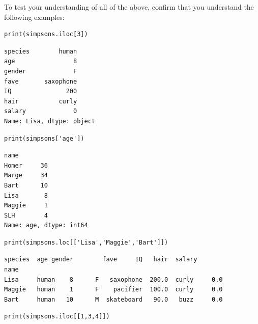 To test your understanding of all of the above, confirm that you understand the
following examples:

\begin{Verbatim}[fontsize=\CBCodeSmall,samepage=true,frame=single,framesep=3mm]
print(simpsons.iloc[3])
\end{Verbatim}
\vspace{-.2in}

\begin{Verbatim}[fontsize=\CBCodeSmall,samepage=true,frame=leftline,framesep=5mm,framerule=1mm]
species        human
age                8
gender             F
fave       saxophone
IQ               200
hair           curly
salary             0
Name: Lisa, dtype: object
\end{Verbatim}

\medskip

\begin{Verbatim}[fontsize=\CBCodeSmall,samepage=true,frame=single,framesep=3mm]
print(simpsons['age'])
\end{Verbatim}
\vspace{-.2in}

\begin{Verbatim}[fontsize=\CBCodeSmall,samepage=true,frame=leftline,framesep=5mm,framerule=1mm]
name
Homer     36
Marge     34
Bart      10
Lisa       8
Maggie     1
SLH        4
Name: age, dtype: int64
\end{Verbatim}

\medskip
\begin{Verbatim}[fontsize=\CBCodeSmall,samepage=true,frame=single,framesep=3mm]
print(simpsons.loc[['Lisa','Maggie','Bart']])
\end{Verbatim}
\vspace{-.2in}

\begin{Verbatim}[fontsize=\CBCodeSmall,samepage=true,frame=leftline,framesep=5mm,framerule=1mm]
       species  age gender        fave     IQ   hair  salary
name                                                        
Lisa     human    8      F   saxophone  200.0  curly     0.0
Maggie   human    1      F    pacifier  100.0  curly     0.0
Bart     human   10      M  skateboard   90.0   buzz     0.0
\end{Verbatim}

\medskip
\begin{Verbatim}[fontsize=\CBCodeSmall,samepage=true,frame=single,framesep=3mm]
print(simpsons.iloc[[1,3,4]])
\end{Verbatim}
\vspace{-.2in}

